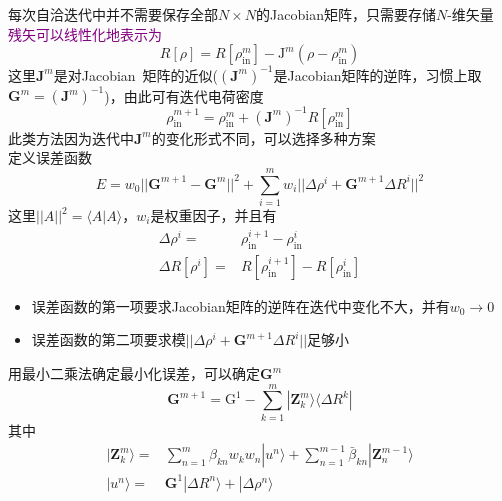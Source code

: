 {{\begin{itemize}
	每次自洽迭代中并不需要保存全部$N\times N$的\textrm{Jacobian}矩阵，只需要存储$N$-维矢量\\
	\textcolor{purple}{残矢可以线性化地表示为}
	\begin{displaymath}
		R[\rho]=R[\rho_{\mathrm{in}}^m]-\mathrm{J}^m(\rho-\rho_{\mathrm{in}}^m)
	\end{displaymath}
	这里$\mathbf{J}^m$是对\textrm{Jacobian~}矩阵的近似($(\mathbf{J}^m)^{-1}$是\textrm{Jacobian}矩阵的逆阵，习惯上取$\mathbf{G}^m=(\mathbf{J}^m)^{-1}$)，由此可有迭代电荷密度
	\begin{displaymath}
		\rho_{\mathrm{in}}^{m+1}=\rho_{\mathrm{in}}^m+(\mathbf{J}^m)^{-1}R[\rho_{\mathrm{in}}^m]
	\end{displaymath}
	此类方法因为迭代中$\mathbf{J}^m$的变化形式不同，可以选择多种方案\\
	定义误差函数
	\begin{displaymath}
		E=w_0||\mathbf{G}^{m+1}-\mathbf{G}^m||^2+\sum_{i=1}^mw_i||\Delta\rho^i+\mathbf{G}^{m+1}\Delta R^i||^2
	\end{displaymath}
	这里$||A||^2=\langle A|A\rangle$，$w_i$是权重因子，并且有
	\begin{displaymath}
		\begin{aligned}
			\Delta\rho^i=&\rho_{\mathrm{in}}^{i+1}-\rho_{\mathrm{in}}^{i}\\
			\Delta R[\rho^i]=&R[\rho_{\mathrm{in}}^{i+1}]-R[\rho_{\mathrm{in}}^{i}]
		\end{aligned}
	\end{displaymath}
	\begin{itemize}
		\item 误差函数的第一项要求\textrm{Jacobian}矩阵的逆阵在迭代中变化不大，并有$w_0\rightarrow0$
		\item 误差函数的第二项要求模$||\Delta\rho^i+\mathbf{G}^{m+1}\Delta R^i||$足够小
	\end{itemize}
	用最小二乘法确定最小化误差，可以确定$\mathbf{G}^m$
	\begin{displaymath}
		\mathbf{G}^{m+1}=\mathrm{G}^1-\sum_{k=1}^m|\mathbf{Z}_k^m\rangle\langle\Delta R^k|
	\end{displaymath}
	其中
	\begin{displaymath}
		\begin{aligned}
			|\mathbf{Z}_k^m\rangle=&\sum_{n=1}^m\beta_{kn}w_kw_n|u^n\rangle+\sum_{n=1}^{m-1}\bar{\beta}_{kn}|\mathbf{Z}_n^{m-1}\rangle\\
			|u^n\rangle=&\mathbf{G}^1|\Delta R^n\rangle+|\Delta \rho^n\rangle
		\end{aligned}

\end{displaymath}
\end{itemize}}}
